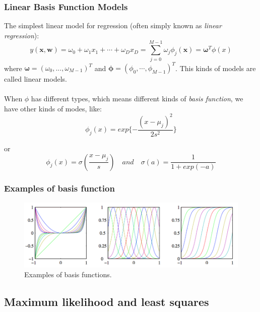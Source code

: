 \documentclass{beamer}
\begin{document}
\begin{frame}
\frametitle{Linear Basis Function Models}


 The simplest linear model for regression (often simply known as \textit{linear regression}):
\begin{equation}
y(\bm{x},\bm{w})=\omega_0+\omega_1x_1+\cdots+\omega_Dx_D = \sum_{j=0}^{M-1}\omega_j\phi_j(\bm{x})=\bm{\omega}^T\phi(x)
\end{equation}
where $\bm{\omega}=(\omega_0,...,\omega_{M-1})^T$ and $\bm{\phi}=(\phi_0,\cdots,\phi_{M-1})^T$. This kinds of models are called linear models.\\~\\

 When $\phi$ has different types, which means different kinds of \textit{basis function}, we have other kinds of modes, like:
\begin{equation}
\phi_j(x) = exp\{-\frac{(x-\mu_j)^2}{2s^2}\}
\end{equation}

or
\begin{equation}
\phi_j(x) = \sigma(\frac{x-\mu_j}{s}) \quad and \quad \sigma(a) = \frac{1}{1+exp(-a)}
\end{equation} 

\end{frame}

\begin{frame}
\frametitle{Examples of basis function}
\begin{figure}
\includegraphics[width=12cm]{Figure1}
\caption{Examples of basis functions.}
\label{Figure1}
\end{figure}
\end{frame}

\subsection{Maximum likelihood and least squares} 


\end{document}
